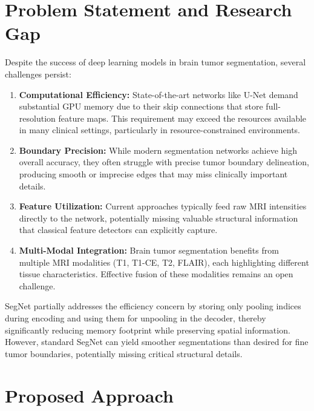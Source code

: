 \section{Problem Statement and Research Gap}
\label{sec:problem_statement}

Despite the success of deep learning models in brain tumor segmentation, several challenges persist:

\begin{enumerate}
    \item \textbf{Computational Efficiency:} State-of-the-art networks like U-Net demand substantial GPU memory due to their skip connections that store full-resolution feature maps. This requirement may exceed the resources available in many clinical settings, particularly in resource-constrained environments.
    
    \item \textbf{Boundary Precision:} While modern segmentation networks achieve high overall accuracy, they often struggle with precise tumor boundary delineation, producing smooth or imprecise edges that may miss clinically important details.
    
    \item \textbf{Feature Utilization:} Current approaches typically feed raw MRI intensities directly to the network, potentially missing valuable structural information that classical feature detectors can explicitly capture.
    
    \item \textbf{Multi-Modal Integration:} Brain tumor segmentation benefits from multiple MRI modalities (T1, T1-CE, T2, FLAIR), each highlighting different tissue characteristics. Effective fusion of these modalities remains an open challenge.
\end{enumerate}

SegNet \cite{badrinarayanan2017segnet} partially addresses the efficiency concern by storing only pooling indices during encoding and using them for unpooling in the decoder, thereby significantly reducing memory footprint while preserving spatial information. However, standard SegNet can yield smoother segmentations than desired for fine tumor boundaries, potentially missing critical structural details.

\section{Proposed Approach}
\label{sec:proposed_approach}

